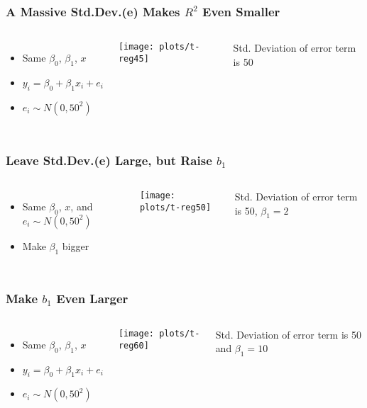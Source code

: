 \documentclass[10pt,english]{beamer}
\newenvironment{topcolumns}{\begin{columns}[t]}{\end{columns}}
\def\Sweavesize{\normalsize}
\begin{document}
\begin{frame}[containsverbatim]
\frametitle{A Massive Std.Dev.(e) Makes $R^2$ Even Smaller}


\begin{topcolumns}%


\column{6cm}
\begin{itemize}
\item Same $\beta_{0}$, $\beta_{1}$, $x$
\item $y_{i}=\beta_{0}+\beta_{1}x_{i}+e_{i}$
\item $e_{i}\sim N(0,50^{2})$
\end{itemize}

\def\Sweavesize{\scriptsize}



\column{6cm}


\texttt{[image: plots/t-reg45]}

Std. Deviation of error term is 50
\end{topcolumns}%
\end{frame}

\begin{frame}[containsverbatim]
\frametitle{Leave Std.Dev.(e) Large, but Raise $b_1$}


\begin{topcolumns}%


\column{6cm}
\begin{itemize}
\item Same $\beta_{0}$, $x$, and $e_{i}\sim N(0,50^{2})$
\item Make $\beta_{1}$ bigger
\end{itemize}

\def\Sweavesize{\scriptsize}



\column{6cm}


\texttt{[image: plots/t-reg50]}

Std. Deviation of error term is 50, $\beta_{1}=2$
\end{topcolumns}%
\end{frame}

\begin{frame}[containsverbatim]
\frametitle{Make $b_1$ Even Larger}


\begin{topcolumns}%


\column{6cm}
\begin{itemize}
\item Same $\beta_{0}$, $\beta_{1}$, $x$
\item $y_{i}=\beta_{0}+\beta_{1}x_{i}+e_{i}$
\item $e_{i}\sim N(0,50^{2})$
\end{itemize}

\def\Sweavesize{\scriptsize}



\column{6cm}


\texttt{[image: plots/t-reg60]}

Std. Deviation of error term is 50 and $\beta_{1}=10$
\end{topcolumns}%
\end{frame}
\end{document}
